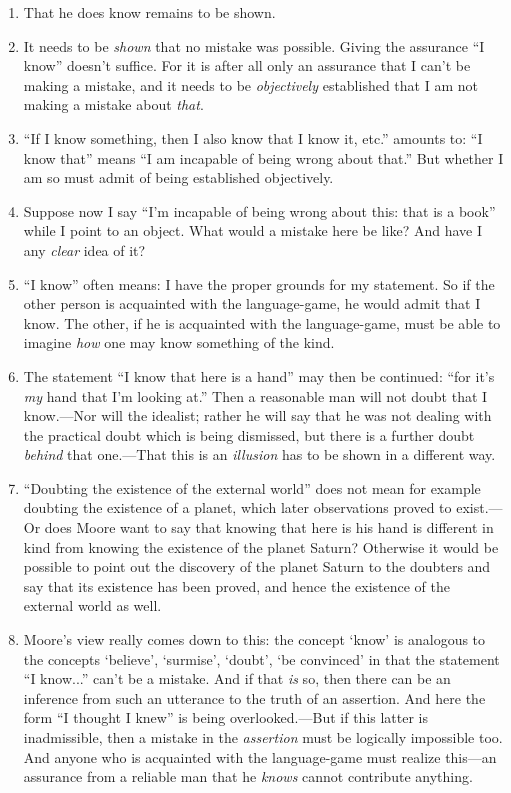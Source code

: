 \documentclass{book}
\begin{document}
\begin{enumerate}
\item
That he does know remains to be shown.

\item
It needs to be \emph{shown} that no mistake was possible. Giving the assurance
``I know'' doesn't suffice. For it is after all only an assurance that I can't
be making a mistake, and it needs to be \emph{objectively} established that I
am not making a mistake about \emph{that}.

\item
``If I know something, then I also know that I know it, etc.'' amounts to: ``I
know that'' means ``I am incapable of being wrong about that.'' But whether I
am so must admit of being established objectively.

\item
Suppose now I say ``I'm incapable of being wrong about this: that is a book''
while I point to an object. What would a mistake here be like? And have I any
\emph{clear} idea of it?

\item
``I know'' often means: I have the proper grounds for my statement. So if the
other person is acquainted with the language-game, he would admit that I know.
The other, if he is acquainted with the language-game, must be able to imagine
\emph{how} one may know something of the kind.

\item
The statement ``I know that here is a hand'' may then be continued: ``for it's
\emph{my} hand that I'm looking at.'' Then a reasonable man will not doubt that
I know.---Nor will the idealist; rather he will say that he was not dealing
with the practical doubt which is being dismissed, but there is a further doubt
\emph{behind} that one.---That this is an \emph{illusion} has to be shown in a
different way.

\item
``Doubting the existence of the external world'' does not mean for example
doubting the existence of a planet, which later observations proved to
exist.---Or does Moore want to say that knowing that here is his hand is
different in kind from knowing the existence of the planet Saturn? Otherwise it
would be possible to point out the discovery of the planet Saturn to the
doubters and say that its existence has been proved, and hence the existence of
the external world as well.

\item
Moore's view really comes down to this: the concept `know' is analogous to the
concepts `believe', `surmise', `doubt', `be convinced' in that the statement
``I know...'' can't be a mistake. And if that \emph{is} so, then there can be
an inference from such an utterance to the truth of an assertion. And here the
form ``I thought I knew'' is being overlooked.---But if this latter is
inadmissible, then a mistake in the \emph{assertion} must be logically
impossible too.  And anyone who is acquainted with the language-game must
realize this---an assurance from a reliable man that he \emph{knows} cannot
contribute anything.


\end{enumerate}
\end{document}
